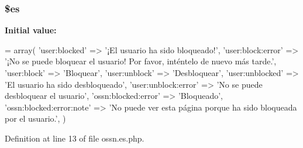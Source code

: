 \subsubsection[{\texorpdfstring{\$es}{$es}}]{\setlength{\rightskip}{0pt plus 5cm}\$es}\hypertarget{components_2_ossn_block_2locale_2ossn_8es_8php_a388cbda27103d2baee3997798d1f2744}{}\label{components_2_ossn_block_2locale_2ossn_8es_8php_a388cbda27103d2baee3997798d1f2744}
{\bfseries Initial value\+:}
\begin{DoxyCode}
= array(
    \textcolor{stringliteral}{'user:blocked'} => \textcolor{stringliteral}{'¡El usuario ha sido bloqueado!'},
    \textcolor{stringliteral}{'user:block:error'} => \textcolor{stringliteral}{'¡No se puede bloquear el usuario! Por favor, inténtelo de nuevo más tarde.'},
    \textcolor{stringliteral}{'user:block'} => \textcolor{stringliteral}{'Bloquear'},
    \textcolor{stringliteral}{'user:unblock'} => \textcolor{stringliteral}{'Desbloquear'},
    \textcolor{stringliteral}{'user:unblocked'} => \textcolor{stringliteral}{'El usuario ha sido desbloqueado'},
    \textcolor{stringliteral}{'user:unblock:error'} => \textcolor{stringliteral}{'No se puede desbloquear el usuario'},
    \textcolor{stringliteral}{'ossn:blocked:error'} => \textcolor{stringliteral}{'Bloqueado'},
    \textcolor{stringliteral}{'ossn:blocked:error:note'} => \textcolor{stringliteral}{'No puede ver esta página porque ha sido bloqueada por el usuario.'},
)
\end{DoxyCode}


Definition at line 13 of file ossn.\+es.\+php.

